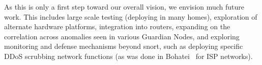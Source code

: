 As this is only a first step toward our overall vision, we envision much future work.
This includes large scale testing (deploying in many homes), exploration of alternate hardware platforms, integration into routers, expanding on the correlation across anomalies seen in various Guardian Nodes, and exploring 
monitoring and defense mechanisms beyond snort, such as deploying specific DDoS scrubbing network functions (as was done in Bohatei~\cite{bohatei} for ISP networks).

%
%


